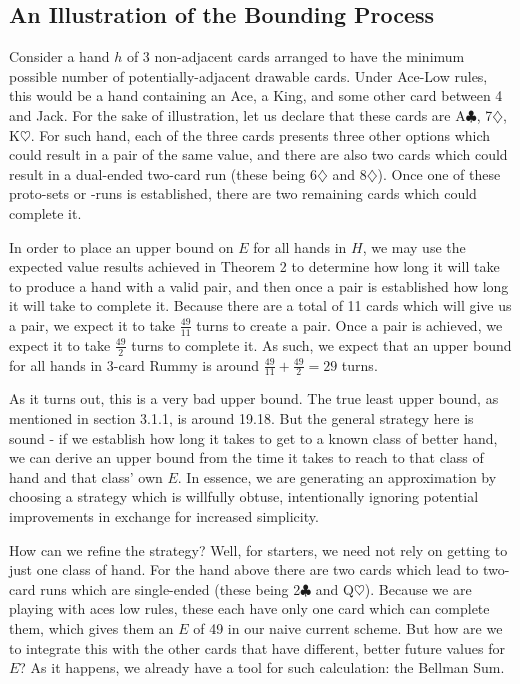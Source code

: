 \documentclass[letter,12pt]{article}
\begin{document}
\subsection{An Illustration of the Bounding Process}

Consider a hand $h$ of 3 non-adjacent cards arranged to have the minimum possible number of potentially-adjacent drawable cards. Under Ace-Low rules, this would be a hand containing an Ace, a King, and some other card between 4 and Jack. For the sake of illustration, let us declare that these cards are A$\clubsuit$, 7$\diamondsuit$, K$\heartsuit$. For such hand, each of the three cards presents three other options which could result in a pair of the same value, and there are also two cards which could result in a dual-ended two-card run (these being 6$\diamondsuit$ and 8$\diamondsuit$). Once one of these proto-sets or -runs is established, there are two remaining cards which could complete it.

In order to place an upper bound on $E$ for all hands in $H$, we may use the expected value results achieved in Theorem 2 to determine how long it will take to produce a hand with a valid pair, and then once a pair is established how long it will take to complete it. Because there are a total of 11 cards which will give us a pair, we expect it to take $\frac{49}{11}$ turns to create a pair. Once a pair is achieved, we expect it to take $\frac{49}{2}$ turns to complete it. As such, we expect that an upper bound for all hands in 3-card Rummy is around $\frac{49}{11} + \frac{49}{2} = 29$ turns.

As it turns out, this is a very bad upper bound. The true least upper bound, as mentioned in section 3.1.1, is around 19.18. But the general strategy here is sound - if we establish how long it takes to get to a known class of better hand, we can derive an upper bound from the time it takes to reach to that class of hand and that class' own $E$. In essence, we are generating an approximation by choosing a strategy which is willfully obtuse, intentionally ignoring potential improvements in exchange for increased simplicity.

How can we refine the strategy? Well, for starters, we need not rely on getting to just one class of hand. For the hand above there are two cards which lead to two-card runs which are single-ended (these being 2$\clubsuit$ and Q$\heartsuit$). Because we are playing with aces low rules, these each have only one card which can complete them, which gives them an $E$ of 49 in our naive current scheme. But how are we to integrate this with the other cards that have different, better future values for $E$? As it happens, we already have a tool for such calculation: the Bellman Sum.
\end{document}
